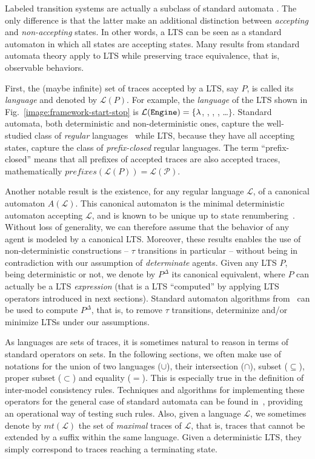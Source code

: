 Labeled transition systems are actually a subclass of standard automata \cite{Hopcroft:1979}. The only difference is that the latter make an additional distinction between \emph{accepting} and \emph{non-accepting} states. In other words, a LTS can be seen as a standard automaton in which all states are accepting states. Many results from standard automata theory apply to LTS while preserving trace equivalence, that is, observable behaviors.

First, the (maybe infinite) set of traces accepted by a LTS, say $P$, is called its \emph{language} and denoted by $\mathcal{L}(P)$. For example, the  \emph{language} of the LTS shown in Fig.~\ref{image:framework-start-stop} is $\mathcal{L}(\texttt{Engine})=\{\lambda$, , , , \ldots $\}$. Standard automata, both deterministic and non-deterministic ones, capture the well-studied class of \emph{regular} languages~\cite{Hopcroft:1979} while LTS, because they have all accepting states, capture the class of \emph{prefix-closed} regular languages. The term ``prefix-closed'' means that all prefixes of accepted traces are also accepted traces, mathematically $prefixes(\mathcal{L}(P)) = \mathcal{L(P)}$.

Another notable result is the existence, for any regular language $\mathcal{L}$, of a canonical automaton $A(\mathcal{L})$. This canonical automaton is the minimal deterministic automaton accepting $\mathcal{L}$, and is known to be unique up to state renumbering~\cite{Gold:1978}. Without loss of generality, we can therefore assume that the behavior of any agent is modeled by a canonical LTS. Moreover, these results enables the use of non-deterministic constructions -- $\tau$ transitions in particular -- without being in contradiction with our assumption of \emph{determinate} agents. Given any LTS $P$, being deterministic or not, we denote by $P^{\Delta}$ its canonical equivalent, where $P$ can actually be a LTS \emph{expression} (that is a LTS ``computed'' by applying LTS operators introduced in next sections). Standard automaton algorithms from~\cite{Hopcroft:1979} can be used to compute $P^\Delta$, that is, to remove $\tau$ transitions, determinize and/or minimize LTSs under our assumptions.

As languages are sets of traces, it is sometimes natural to reason in terms of standard operators on sets. In the following sections, we often make use of notations for the union of two languages ($\cup$), their intersection ($\cap$), subset ($\subseteq$), proper subset ($\subset$) and equality ($=$). This is especially true in the definition of inter-model consistency rules. Techniques and algorithms for implementing these operators for the general case of standard automata can be found in~\cite{Hopcroft:1979, Aho:1986}, providing an operational way of testing such rules. Also, given a language $\mathcal{L}$, we sometimes denote by $mt(\mathcal{L})$ the set of \emph{maximal} traces of $\mathcal{L}$, that is, traces that cannot be extended by a suffix within the same language. Given a deterministic LTS, they simply correspond to traces reaching a terminating state. 

